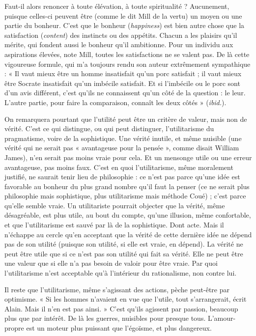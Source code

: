 Faut-il alors renoncer à toute élévation, à toute spiritualité ? Aucunement,
puisque celles-ci peuvent être (comme le dit Mill de la vertu) un moyen ou une
partie du bonheur. C’est que le bonheur ({\it happiness}) est bien autre chose que la
satisfaction ({\it content}) des instincts ou des appétits. Chacun a les plaisirs qu’il
mérite, qui fondent aussi le bonheur qu’il ambitionne. Pour un individu aux
aspirations élevées, note Mill, toutes les satisfactions ne se valent pas. De là
cette vigoureuse formule, qui m’a toujours rendu son auteur extrêmement
sympathique : « Il vaut mieux être un homme insatisfait qu’un porc satisfait ; il
vaut mieux être Socrate insatisfait qu’un imbécile satisfait. Et si l’imbécile ou le
porc sont d’un avis différent, c’est qu’ils ne connaissent qu’un côté de la
question : le leur. L’autre partie, pour faire la comparaison, connaît les deux
côtés » ({\it ibid.}).

On remarquera pourtant que l'utilité peut être un critère de valeur, mais
non de vérité. C’est ce qui distingue, ou qui peut distinguer, l’utilitarisme du
pragmatisme, voire de la sophistique. Une vérité inutile, et même nuisible (une
vérité qui ne serait pas « avantageuse pour la pensée », comme disait William
James), n’en serait pas moins vraie pour cela. Et un mensonge utile ou une
erreur avantageuse, pas moins faux. C’est en quoi l’utilitarisme, même moralement
justifié, ne saurait tenir lieu de philosophie : ce n’est pas parce qu’une
idée est favorable au bonheur du plus grand nombre qu’il faut la penser (ce ne
serait plus philosophie mais sophistique, plus utilitarisme mais méthode
Coué) ; c’est parce qu’elle semble vraie. Un utilitariste pourrait objecter que la
vérité, même désagréable, est plus utile, au bout du compte, qu’une illusion,
même confortable, et que l’utilitarisme est sauvé par là de la sophistique. Dont
acte. Mais il n’échappe au cercle qu’en acceptant que la vérité de cette dernière
idée ne dépend pas de son utilité (puisque son utilité, si elle est vraie, en
dépend). La vérité ne peut être utile que si ce n’est pas son utilité qui fait sa
vérité. Elle ne peut être une valeur que si elle n’a pas besoin de valoir pour être
vraie. Par quoi l’utilitarisme n’est acceptable qu’à l’intérieur du rationalisme,
non contre lui.

Il reste que l’utilitarisme, même s'agissant des actions, pèche peut-être par
optimisme. « Si les hommes n’avaient en vue que l’utile, tout s’arrangerait, écrit
Alain. Mais il n’en est pas ainsi. » C’est qu’ils agissent par passion, beaucoup
plus que par intérêt. De là les guerres, nuisibles pour presque tous. L’amour-propre
est un moteur plus puissant que l’égoïsme, et plus dangereux.

